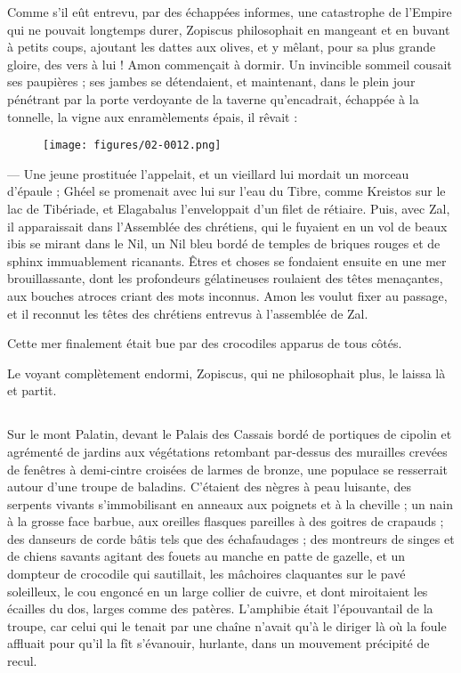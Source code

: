 \documentclass[a4paper, 11pt, oneside, polutonikogreek, french]{article}
\begin{document}
Comme s'il eût entrevu, par des échappées informes, une catastrophe de l'Empire qui ne pouvait longtemps durer, Zopiscus philosophait en mangeant et en buvant à petits coups, ajoutant les dattes aux olives, et y mêlant, pour sa plus grande gloire, des vers à lui ! Amon commençait à dormir. Un invincible sommeil cousait ses paupières ; ses jambes se détendaient, et maintenant, dans le plein jour pénétrant par la porte verdoyante de la taverne qu'encadrait, échappée à la tonnelle, la vigne aux enramèlements épais, il rêvait :
\begin{figure}[H]
\centering
\texttt{[image: figures/02-0012.png]}
\end{figure}
--- Une jeune prostituée l'appelait, et un vieillard lui mordait un morceau d'épaule ; Ghéel se promenait avec lui sur l'eau du Tibre, comme Kreistos sur le lac de Tibériade, et Elagabalus l'enveloppait d'un filet de rétiaire. Puis, avec Zal, il apparaissait dans l'Assemblée des chrétiens, qui le fuyaient en un vol de beaux ibis se mirant dans le Nil, un Nil bleu bordé de temples de briques rouges et de sphinx immuablement ricanants. Êtres et choses se fondaient ensuite en une mer brouillassante, dont les profondeurs gélatineuses roulaient des têtes menaçantes, aux bouches atroces criant des mots inconnus. Amon les voulut fixer au passage, et il reconnut les têtes des chrétiens entrevus à l'assemblée de Zal.

Cette mer finalement était bue par des crocodiles apparus de tous côtés.

Le voyant complètement endormi, Zopiscus, qui ne philosophait plus, le laissa là et partit.
\clearpage
\subsection{}
\paragraph{}
Sur le mont Palatin, devant le Palais des Cassais bordé de portiques de cipolin et agrémenté de jardins aux végétations retombant par-dessus des murailles crevées de fenêtres à demi-cintre croisées de larmes de bronze, une populace se resserrait autour d'une troupe de baladins. C'étaient des nègres à peau luisante, des serpents vivants s'immobilisant en anneaux aux poignets et à la cheville ; un nain à la grosse face barbue, aux oreilles flasques pareilles à des goitres de crapauds ; des danseurs de corde bâtis tels que des échafaudages ; des montreurs de singes et de chiens savants agitant des fouets au manche en patte de gazelle, et un dompteur de crocodile qui sautillait, les mâchoires claquantes sur le pavé soleilleux, le cou engoncé en un large collier de cuivre, et dont miroitaient les écailles du dos, larges comme des patères. L'amphibie était l'épouvantail de la troupe, car celui qui le tenait par une chaîne n'avait qu'à le diriger là où la foule affluait pour qu'il la fît s'évanouir, hurlante, dans un mouvement précipité de recul.
\end{document}
